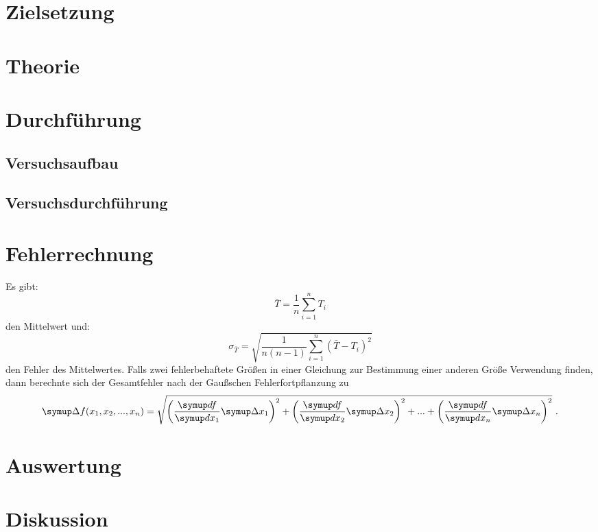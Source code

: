 \maketitle
\tableofcontents
\newpage

\section{Zielsetzung}

\section{Theorie}


\section{Durchführung}
\subsection{Versuchsaufbau}

\subsection{Versuchsdurchführung}

 \section{Fehlerrechnung}
 Es gibt:
 \begin{equation}
   \bar{T} = \frac{1}{n} \sum_{i=1}^{n} T_{i}
   \label{eqn:1}
 \end{equation}
 den Mittelwert und:
 \begin{equation}
   \sigma_{\bar{T}} = \sqrt{\frac{1}{n(n-1)} \sum_{i=1}^{n}(\bar{T}-T_i)^2}
   \label{eqn:2}
 \end{equation}
 den Fehler des Mittelwertes. Falls zwei fehlerbehaftete Größen in einer Gleichung
 zur Bestimmung einer anderen Größe Verwendung finden, dann berechnte sich der Gesamtfehler
 nach der Gaußschen Fehlerfortpflanzung zu
 \begin{equation}
     \symup \Delta f(x_1, x_2, ..., x_n) = \sqrt{\left(\frac{\symup df}{\symup dx_1} \symup \Delta
     x_1 \right)^2 +    \left(\frac{\symup df}{\symup dx_2} \symup \Delta
     x_2 \right)^2 + ... + \left(\frac{\symup df}{\symup dx_n} \symup \Delta x_n \right)^2} \ .
     \label{eqn:3}
 \end{equation}

\section{Auswertung}

\section{Diskussion}

\newpage
\nocite{*}
\printbibliography
